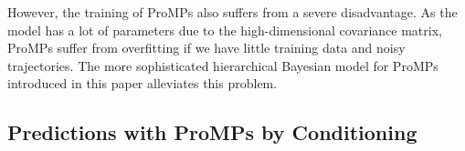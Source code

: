 \documentclass[letterpaper, 10 pt, conference]{ieeeconf}  %
\begin{document}
However, the training of ProMPs also suffers from a severe disadvantage. As the model has a lot of parameters due
to the high-dimensional covariance matrix, ProMPs suffer from overfitting if we have little training data and noisy trajectories. 
The more sophisticated hierarchical Bayesian model for ProMPs introduced in this paper alleviates this problem. 






\subsection{Predictions with ProMPs by Conditioning}
\end{document}
